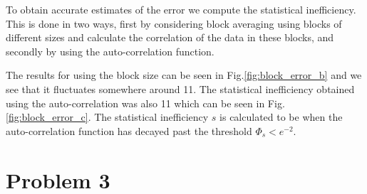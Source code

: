 To obtain accurate estimates of the error we compute the statistical inefficiency. This is done in two ways, first by considering block averaging using blocks of different sizes and calculate the correlation of the data in these blocks, and secondly by using the auto-correlation function.

The results for using the block size can be seen in Fig.\ref{fig:block_error_b} and we see that it fluctuates somewhere around 11. The statistical inefficiency obtained using the auto-correlation was also 11 which can be seen in Fig. \ref{fig:block_error_c}. The statistical inefficiency $s$ is calculated to be when the auto-correlation function has decayed past the threshold $\Phi_s < e^{-2}$.




\section*{Problem 3}


